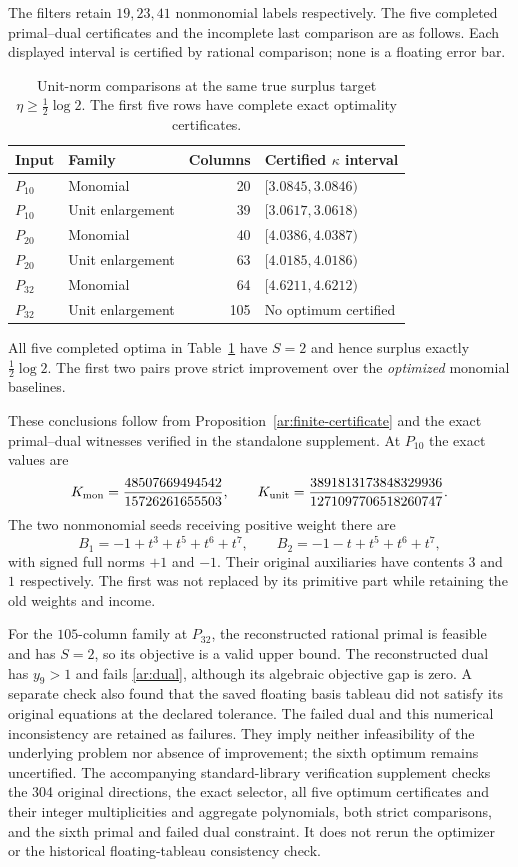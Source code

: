 The filters retain $19,23,41$ nonmonomial labels respectively.
The five completed primal--dual certificates and the incomplete last comparison are as follows.
Each displayed interval is certified by rational comparison; none is a floating error bar.
\begin{table}[htbp]
\centering
\begin{tabular}{llrl}
\toprule
Input & Family & Columns & Certified $\kappa$ interval\\
\midrule
$P_{10}$ & Monomial &20&$[3.0845,3.0846)$\\
$P_{10}$ & Unit enlargement &39&$[3.0617,3.0618)$\\
$P_{20}$ & Monomial &40&$[4.0386,4.0387)$\\
$P_{20}$ & Unit enlargement &63&$[4.0185,4.0186)$\\
$P_{32}$ & Monomial &64&$[4.6211,4.6212)$\\
$P_{32}$ & Unit enlargement &105&No optimum certified\\
\bottomrule
\end{tabular}
\caption{Unit-norm comparisons at the same true surplus target $\eta\ge\frac12\log2$.
The first five rows have complete exact optimality certificates.}
\label{ar:unit-comparison}
\end{table}
\begin{proposition}\label{ar:unit-optima}
All five completed optima in Table~\ref{ar:unit-comparison} have $S=2$ and hence surplus exactly $\frac12\log2$.
The first two pairs prove strict improvement over the \emph{optimized} monomial baselines.
\end{proposition}
These conclusions follow from Proposition~\ref{ar:finite-certificate} and the exact primal--dual witnesses verified in the standalone supplement.
At $P_{10}$ the exact values are
\[
 K_{\rm mon}=\frac{48507669494542}{15726261655503},\qquad
 K_{\rm unit}=\frac{3891813173848329936}{1271097706518260747}.
\]
The two nonmonomial seeds receiving positive weight there are
\[
 B_1=-1+t^3+t^5+t^6+t^7,\qquad
 B_2=-1-t+t^5+t^6+t^7,
\]
with signed full norms $+1$ and $-1$.
Their original auxiliaries have contents $3$ and $1$ respectively.
The first was not replaced by its primitive part while retaining the old weights and income.

For the $105$-column family at $P_{32}$, the reconstructed rational primal is feasible and has $S=2$, so its objective is a valid upper bound.
The reconstructed dual has $y_9>1$ and fails \eqref{ar:dual}, although its algebraic objective gap is zero.
A separate check also found that the saved floating basis tableau did not satisfy its original equations at the declared tolerance.
The failed dual and this numerical inconsistency are retained as failures.
They imply neither infeasibility of the underlying problem nor absence of improvement; the sixth optimum remains uncertified.
The accompanying standard-library verification supplement checks the 304 original directions, the exact selector, all five optimum certificates and their integer multiplicities and aggregate polynomials, both strict comparisons, and the sixth primal and failed dual constraint.
It does not rerun the optimizer or the historical floating-tableau consistency check.

